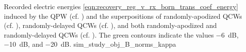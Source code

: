 %
{%
 Recorded electric energies
 \eqref{eqn:recovery_reg_v_rx_born_trans_coef_energy} induced by
 the \acl{QPW}
 (cf. ) and
 the superpositions of
 randomly-apodized \acfp{QCW}
 (cf. ),
 randomly-delayed \acp{QCW}
 (cf. ), and both
 randomly-apodized and
 randomly-delayed \acp{QCW}
 (cf. ).
 The green contours indicate
 the values
 \SI{-6}{\deci\bel},
 \SI{-10}{\deci\bel}, and
 \SI{-20}{\deci\bel}.
}%
{sim_study_obj_B_norms_kappa}

